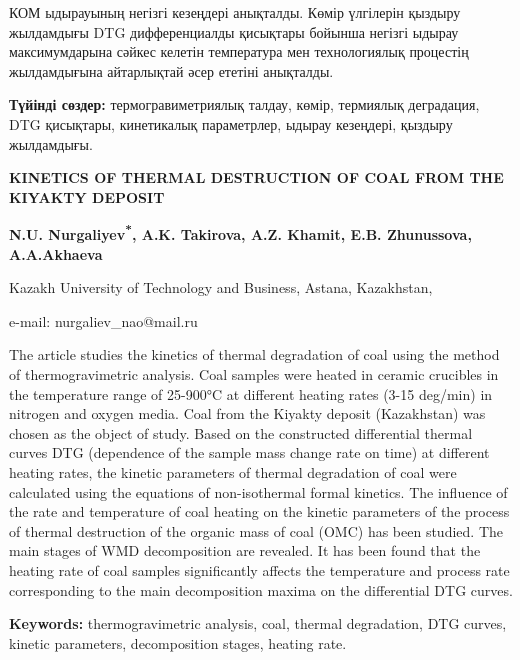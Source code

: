 КОМ ыдырауының негізгі кезеңдері анықталды. Көмір үлгілерін қыздыру
жылдамдығы DTG дифференциалды қисықтары бойынша негізгі ыдырау
максимумдарына сәйкес келетін температура мен технологиялық процестің
жылдамдығына айтарлықтай әсер ететіні анықталды.

\begin{center}
{\large\bfseries Түйінді сөздер:} термогравиметриялық талдау, көмір, термиялық
деградация, DTG қисықтары, кинетикалық параметрлер, ыдырау кезеңдері,
қыздыру жылдамдығы.

{\bfseries KINETICS OF THERMAL DESTRUCTION OF COAL FROM THE KIYAKTY
DEPOSIT}

\vspace{1em}
{\bfseries N.U. Nurgaliyev\textsuperscript{*}, A.K. Takirova, A.Z. Khamit,
E.B. Zhunussova, A.A.Akhaeva}

Kazakh University of Technology and Business, Astana, Kazakhstan,

e-mail: nurgaliev\_nao@mail.ru
\end{center}

The article studies the kinetics of thermal degradation of coal using
the method of thermogravimetric analysis. Coal samples were heated in
ceramic crucibles in the temperature range of 25-900°C at different
heating rates (3-15 deg/min) in nitrogen and oxygen media. Coal from
the Kiyakty deposit (Kazakhstan) was chosen as the object of study.
Based on the constructed differential thermal curves DTG (dependence of
the sample mass change rate on time) at different heating rates, the
kinetic parameters of thermal degradation of coal were calculated using
the equations of non-isothermal formal kinetics. The influence of the
rate and temperature of coal heating on the kinetic parameters of the
process of thermal destruction of the organic mass of coal (OMC) has
been studied. The main stages of WMD decomposition are revealed. It has
been found that the heating rate of coal samples significantly affects
the temperature and process rate corresponding to the main decomposition
maxima on the differential DTG curves.

{\bfseries Keywords:} thermogravimetric analysis, coal, thermal
degradation, DTG curves, kinetic parameters, decomposition stages,
heating rate.

